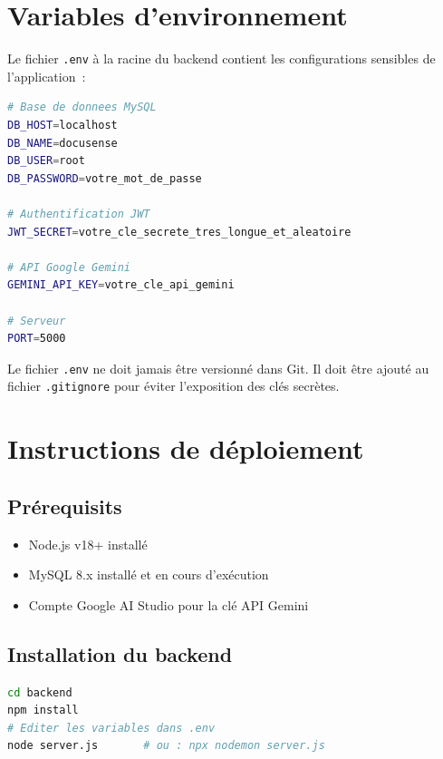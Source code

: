 \documentclass[12pt, a4paper, twoside, openany]{report}
\begin{document}
\appendix

\chapter{Variables d'environnement}

Le fichier \texttt{.env} \`a la racine du backend contient les configurations
sensibles de l'application~:

\begin{lstlisting}[language=bash, caption={Structure du fichier .env (backend)}]
# Base de donnees MySQL
DB_HOST=localhost
DB_NAME=docusense
DB_USER=root
DB_PASSWORD=votre_mot_de_passe

# Authentification JWT
JWT_SECRET=votre_cle_secrete_tres_longue_et_aleatoire

# API Google Gemini
GEMINI_API_KEY=votre_cle_api_gemini

# Serveur
PORT=5000
\end{lstlisting}

\begin{important}[S\'ecurit\'e]
Le fichier \texttt{.env} ne doit jamais \^etre versionn\'e dans Git.
Il doit \^etre ajout\'e au fichier \texttt{.gitignore} pour \'eviter
l'exposition des cl\'es secr\`etes.
\end{important}

\chapter{Instructions de d\'eploiement}

\section*{Pr\'erequisits}
\begin{itemize}
  \item Node.js v18+ install\'e
  \item MySQL 8.x install\'e et en cours d'ex\'ecution
  \item Compte Google AI Studio pour la cl\'e API Gemini
\end{itemize}

\section*{Installation du backend}
\begin{lstlisting}[language=bash]
cd backend
npm install
# Editer les variables dans .env
node server.js       # ou : npx nodemon server.js
\end{lstlisting}
\end{document}
